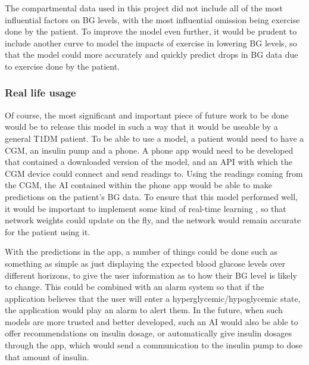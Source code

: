           The compartmental data used in this project did not include all of the most influential factors on BG levels, with the most influential omission being exercise done by the patient. To improve the model even further, it would be prudent to include another curve to model the impacts of exercise in lowering BG levels, so that the model could more accurately and quickly predict drops in BG data due to exercise done by the patient.

        \subsubsection{Real life usage}

         Of course, the most significant and important piece of future work to be done would be to release this model in such a way that it would be useable by a general T1DM patient. To be able to use a model, a patient would need to have a CGM, an insulin pump and a phone. A phone app would need to be developed that contained a downloaded version of the model, and an API with which the CGM device could connect and send readings to. Using the readings coming from the CGM, the AI contained within the phone app would be able to make predictions on the patient's BG data. To ensure that this model performed well, it would be important to implement some kind of real-time learning \cite{rtrl}, so that network weights could update on the fly, and the network would remain accurate for the patient using it.

         With the predictions in the app, a number of things could be done such as something as simple as just displaying the expected blood glucose levels over different horizons, to give the user information as to how their BG level is likely to change. This could be combined with an alarm system so that if the application believes that the user will enter a hyperglycemic/hypoglycemic state, the application would play an alarm to alert them. In the future, when such models are more trusted and better developed, such an AI would also be able to offer recommendations on insulin dosage, or automatically give insulin dosages through the app, which would send a communication to the insulin pump to dose that amount of insulin.
    


\printbibliography[title={References},heading=bibintoc] %



